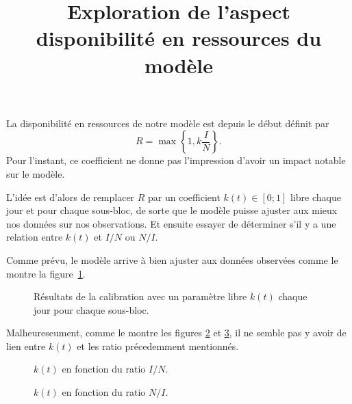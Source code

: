 \documentclass[a4paper, 11pt]{article}
\title{Exploration de l'aspect disponibilité en ressources du modèle}
\author{}
\date{}
\begin{document}
 \maketitle
 
 La disponibilité en ressources de notre modèle est depuis le début définit par
 \[
  R = \max\left\{1, k\frac{I}{N}\right\}.
 \]
 Pour l'instant, ce coefficient ne donne pas l'impression d'avoir un impact notable sur le modèle.
 
 L'idée est d'alors de remplacer $R$ par un coefficient $k(t) \in [0;1]$ libre chaque jour et pour chaque sous-bloc, de sorte que le modèle puisse ajuster aux mieux nos données sur nos observations. Et ensuite essayer de déterminer s'il y a une relation entre $k(t)$ et $I/N$ ou $N/I$.

 Comme prévu, le modèle arrive à bien ajuster aux données observées comme le montre la figure~\ref{toto}.
 \begin{figure}[ht]
  \centering
  \caption{Résultats de la calibration avec un paramètre libre $k(t)$ chaque jour pour chaque sous-bloc.}
  \label{toto}
 \end{figure}

 Malheureseument, comme le montre les figures \ref{tutu} et \ref{titi}, il ne semble pas y avoir de lien entre $k(t)$ et les ratio précedemment mentionnés.
 
 
  \begin{figure}[ht]
  \centering
  \caption{$k(t)$ en fonction du ratio $I/N$.}
  \label{tutu}
 \end{figure}

  \begin{figure}[ht]
  \centering
  \caption{$k(t)$ en fonction du ratio $N/I$.}
  \label{titi}
 \end{figure}

 
 
\end{document}

